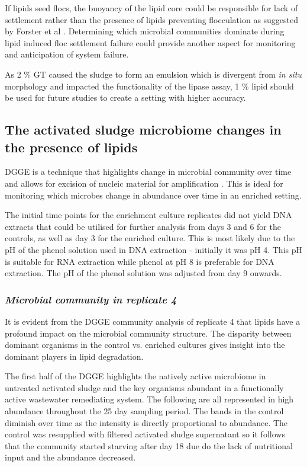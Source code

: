 \documentclass[11pt]{article}
\begin{document}
If lipids seed flocs, the buoyancy of the lipid core could be responsible for lack of settlement rather than the presence of lipids preventing flocculation as suggested by Forster et al \citep{Forster_92}. Determining which microbial communities dominate during lipid induced floc settlement failure could provide another aspect for monitoring and anticipation of system failure.


As 2 \% GT caused the sludge to form an emulsion which is divergent from \emph{in situ} morphology and impacted the functionality of the lipase assay, 1 \% lipid should be used for future studies to create a setting with higher accuracy.

\subsection{The activated sludge microbiome changes in the presence of lipids}
DGGE is a technique that highlights change in microbial community over time and allows for excision of nucleic material for amplification \cite{yang2012evolution}. This is ideal for monitoring which microbes change in abundance over time in an enriched setting.



The initial time points for the enrichment culture replicates did not yield DNA extracts that could be utilised for further analysis from days 3 and 6 for the controls, as well as day 3 for the enriched culture. This is most likely due to the pH of the phenol solution used in DNA extraction - initially it was pH 4. This pH is suitable for RNA extraction while phenol at pH 8 is preferable for DNA extraction. The pH of the phenol solution was adjusted from day 9 onwards.

\subsubsection{\emph{Microbial community in replicate 4}}
It is evident from the DGGE community analysis of replicate 4 that lipids have a profound impact on the microbial community structure. The disparity between dominant organisms in the control vs. enriched cultures gives insight into the dominant players in lipid degradation. 

The first half of the DGGE highlights the natively active microbiome in untreated activated sludge and the key organisms abundant in a functionally active wastewater remediating system. The following are all represented in high abundance throughout the 25 day sampling period. The bands in the control diminish over time as the intensity is directly proportional to abundance. The control was resupplied with filtered activated sludge supernatant so it follows that the community started starving after day 18 due do the lack of nutritional input and the abundance decreased.
\end{document}
